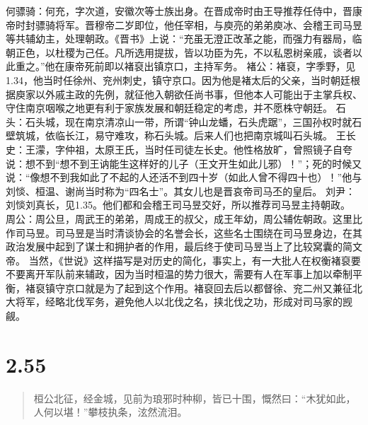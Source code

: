\documentclass[]{book}
\begin{document}
何骠骑：何充，字次道，安徽次等士族出身。在晋成帝时由王导推荐任侍中，晋康帝时封骠骑将军。晋穆帝二岁即位，他任宰相，与庾亮的弟弟庾冰、会稽王司马昱等共辅幼主，处理朝政。《晋书》上说：``充虽无澄正改革之能，而强力有器局，临朝正色，以杜稷为己任。凡所选用提拔，皆以功臣为先，不以私恩树亲戚，谈者以此重之。''他在康帝死前即以褚裒出镇京口，主持军务。
褚公：褚裒，字季野，见1.34，他当时任徐州、兖州刺史，镇守京口。因为他是褚太后的父亲，当时朝廷根据庾家以外戚主政的先例，就征他入朝欲任尚书事，但他本人可能出于主掌兵权、守住南京咽喉之地更有利于家族发展和朝廷稳定的考虑，并不愿株守朝廷。
石头：石头城，现在南京清凉山一带，所谓``钟山龙蟠，石头虎踞''，三国孙权时就石壁筑城，依临长江，易守难攻，称石头城。后来人们也把南京城叫石头城。
王长史：王濛，字仲祖，太原王氏，当时任司徒左长史。他性格放旷，曾照镜子自夸说：想不到``想不到王讷能生这样好的儿子（王文开生如此儿邪）！''；死的时候又说：``像想不到我如此了不起的人还活不到四十岁（如此人曾不得四十也）！''他与刘惔、桓温、谢尚当时称为``四名士''。其女儿也是晋哀帝司马丕的皇后。
刘尹：刘惔刘真长，见1.35。他们都和会稽王司马昱交好，所以推荐司马昱主持朝政。
周公：周公旦，周武王的弟弟，周成王的叔父，成王年幼，周公辅佐朝政。这里比作司马昱。司马昱是当时清谈协会的名誉会长，这些名士围绕在司马昱身边，在其政治发展中起到了谋士和拥护者的作用，最后终于使司马昱当上了比较窝囊的简文帝。
当然，《世说》这样描写是对历史的简化，事实上，有一大批人在权衡褚裒要不要离开军队前来辅政，因为当时桓温的势力很大，需要有人在军事上加以牵制平衡，褚裒镇守京口就是为了起到这个作用。褚裒回去后以都督徐、兖二州又兼征北大将军，经略北伐军务，避免他人以北伐之名，挟北伐之功，形成对司马家的觊觎。

\section{2.55}\label{section-101}

\begin{quote}
桓公北征，经金城，见前为琅邪时种柳，皆已十围，慨然曰：``木犹如此，人何以堪！''攀枝执条，泫然流泪。
\end{quote}
\end{document}
